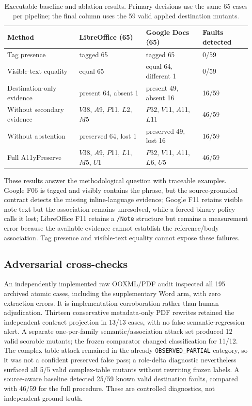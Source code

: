 \begin{table}[t]
\centering
\scriptsize
\caption{Executable baseline and ablation results. Primary decisions use the same 65 cases per pipeline; the final column uses the 59 valid applied destination mutants.}
\label{tab:ablation}
\begin{tabular}{p{}p{}p{}p{}}
\toprule
Method & LibreOffice (65) & Google Docs (65) & Faults detected \\
\midrule
Tag presence & tagged 65 & tagged 65 & 0/59 \\
Visible-text equality & equal 65 & equal 64, different 1 & 0/59 \\
Destination-only evidence & present 64, absent 1 & present 49, absent 16 & 16/59 \\
Without secondary evidence & $V$38, $A$9, $P$11, $L$2, $M$5 & $P$32, $V$11, $A$11, $L$11 & 46/59 \\
Without abstention & preserved 64, lost 1 & preserved 49, lost 16 & 16/59 \\
Full A11yPreserve & $V$38, $A$9, $P$11, $L$1, $M$5, $U$1 & $P$32, $V$11, $A$11, $L$6, $U$5 & 46/59 \\
\bottomrule
\end{tabular}
\end{table}

These results answer the methodological question with traceable examples. Google F06 is tagged and visibly contains the phrase, but the source-grounded contract detects the missing inline-language evidence; Google F11 retains visible note text but the association remains unresolved, while a forced binary policy calls it lost; LibreOffice F11 retains a \texttt{/Note} structure but remains a measurement error because the available evidence cannot establish the reference/body association. Tag presence and visible-text equality cannot expose these failures.

\subsection{Adversarial cross-checks}
An independently implemented raw OOXML/PDF audit inspected all 195 archived atomic cases, including the supplementary Word arm, with zero extraction errors. It is implementation corroboration rather than human adjudication. Thirteen conservative metadata-only PDF rewrites retained the independent contract projection in 13/13 cases, with no false semantic-regression alert. A separate one-per-family semantic/association attack set produced 12 valid scorable mutants; the frozen comparator changed classification for 11/12. The complex-table attack remained in the already \texttt{OBSERVED\_PARTIAL} category, so it was not a confident preserved false pass; a role-delta diagnostic nevertheless surfaced all 5/5 valid complex-table mutants without rewriting frozen labels. A source-aware baseline detected 25/59 known valid destination faults, compared with 46/59 for the full procedure. These are controlled diagnostics, not independent ground truth.

